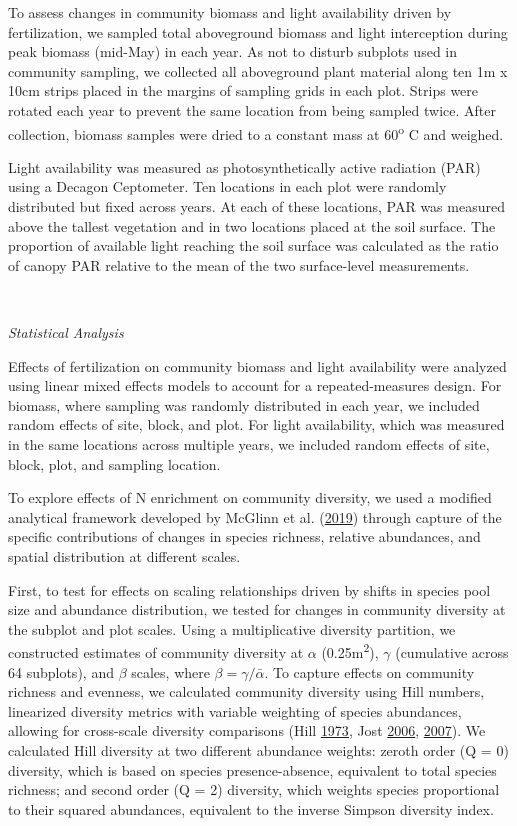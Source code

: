 \documentclass[twoside,12pt,final]{ucthesis-CA2012}
\begin{document}
\begin{ucmainmatter}
To assess changes in community biomass and light availability driven by fertilization, we sampled total aboveground biomass and light interception during peak biomass (mid-May) in each year. As not to disturb subplots used in community sampling, we collected all aboveground plant material along ten 1m x 10cm strips placed in the margins of sampling grids in each plot. Strips were rotated each year to prevent the same location from being sampled twice. After collection, biomass samples were dried to a constant mass at 60\textsuperscript{o} C and weighed.

Light availability was measured as photosynthetically active radiation (PAR) using a Decagon Ceptometer. Ten locations in each plot were randomly distributed but fixed across years. At each of these locations, PAR was measured above the tallest vegetation and in two locations placed at the soil surface. The proportion of available light reaching the soil surface was calculated as the ratio of canopy PAR relative to the mean of the two surface-level measurements.

~

\emph{Statistical Analysis}

Effects of fertilization on community biomass and light availability were analyzed using linear mixed effects models to account for a repeated-measures design. For biomass, where sampling was randomly distributed in each year, we included random effects of site, block, and plot. For light availability, which was measured in the same locations across multiple years, we included random effects of site, block, plot, and sampling location.

To explore effects of N enrichment on community diversity, we used a modified analytical framework developed by McGlinn et al. (\protect\hyperlink{ref-mcglinn2019}{2019}) through capture of the specific contributions of changes in species richness, relative abundances, and spatial distribution at different scales.

First, to test for effects on scaling relationships driven by shifts in species pool size and abundance distribution, we tested for changes in community diversity at the subplot and plot scales. Using a multiplicative diversity partition, we constructed estimates of community diversity at \(\alpha\) (0.25m\textsuperscript{2}), \(\gamma\) (cumulative across 64 subplots), and \(\beta\) scales, where \(\beta = \gamma / \bar{\alpha}\). To capture effects on community richness and evenness, we calculated community diversity using Hill numbers, linearized diversity metrics with variable weighting of species abundances, allowing for cross-scale diversity comparisons (Hill \protect\hyperlink{ref-hil1973}{1973}, Jost \protect\hyperlink{ref-jost2006}{2006}, \protect\hyperlink{ref-jost2007}{2007}). We calculated Hill diversity at two different abundance weights: zeroth order (Q = 0) diversity, which is based on species presence-absence, equivalent to total species richness; and second order (Q = 2) diversity, which weights species proportional to their squared abundances, equivalent to the inverse Simpson diversity index.


\end{ucmainmatter}
\end{document}
